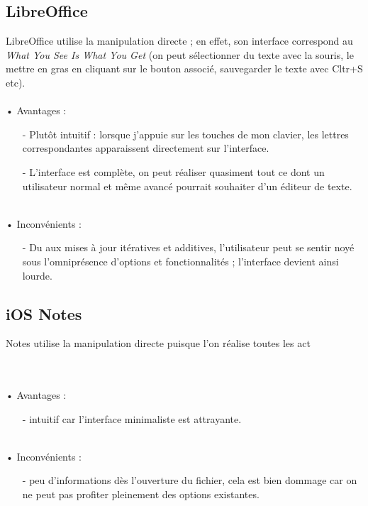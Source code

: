 \documentclass{article}
\begin{document}
\hspace{5em}

\subsection{LibreOffice}
\quad LibreOffice utilise la manipulation directe ; en effet, son interface correspond au \textit{What You See Is What You Get} (on peut sélectionner du texte avec la souris, le mettre en gras en cliquant sur le bouton associé, sauvegarder le texte avec Cltr+S etc).
\text{ }\\
\text{ }\\
• Avantages :
\begin{itemize}
    \item[-] Plutôt intuitif : lorsque j'appuie sur les touches de mon clavier, les lettres correspondantes apparaissent directement sur l'interface.
    \item[-] L'interface est complète, on peut réaliser quasiment tout ce dont un utilisateur normal et même avancé pourrait souhaiter d'un éditeur de texte.
\end{itemize}
\text{ }\\
• Inconvénients :
\begin{itemize}
    \item[-] Du aux mises à jour itératives et additives, l'utilisateur peut se sentir noyé sous l'omniprésence d'options et fonctionnalités ; l'interface devient ainsi lourde.
\end{itemize}

\hspace{5em}

\subsection{iOS Notes}
\quad Notes utilise la manipulation directe puisque l'on réalise toutes les act


\text{ }\\
\text{ }\\
• Avantages :
\begin{itemize}
    \item[-] intuitif car l'interface minimaliste est attrayante.
\end{itemize}
\text{ }\\
• Inconvénients :
\begin{itemize}
    \item[-] peu d'informations dès l'ouverture du fichier, cela est bien dommage car on ne peut pas profiter pleinement des options existantes.
\end{itemize}
\end{document}
